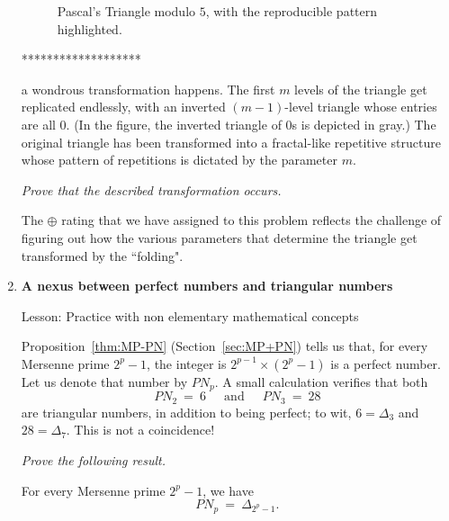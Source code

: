 \begin{enumerate}
{\begin{figure}[ht]
\begin{center}
        \caption{Pascal's Triangle modulo $5$, with the reproducible pattern highlighted.}
        \label{fig:TriangleModulo5shade}
\end{center}
\end{figure}
*******************}
a wondrous transformation happens.  The first $m$ levels of the triangle get replicated endlessly, with an inverted $(m-1)$-level triangle whose entries are all $0$.  (In the figure, the inverted triangle of $0$s is depicted in gray.)  The original triangle has been transformed into a fractal-like repetitive structure whose pattern of repetitions is dictated by the parameter $m$.

\medskip

{\em Prove that the described transformation occurs.}

\smallskip

The $\oplus$ rating that we have assigned to this problem reflects the challenge of figuring out how the various parameters that determine the triangle get transformed by the ``folding".

\medskip\item
{\bf A nexus between perfect numbers and triangular numbers}

{\sc Lesson:} Practice with non elementary mathematical concepts

\smallskip

Proposition~\ref{thm:MP-PN} (Section~\ref{sec:MP+PN}) tells us that, for every Mersenne prime $2^p-1$, the integer is $2^{p-1} \times (2^p-1)$ is a perfect number.  Let us denote that number by $PN_p$.  A small calculation verifies that both
\[ PN_2 \ = \ 6 \ \ \ \ \ \mbox{ and } \ \ \ \ \ PN_3 \ = \ 28 \]
are triangular numbers, in addition to being perfect; to wit, $6 =\Delta_3$ and $28=\Delta_7$.  This is not a coincidence!

\smallskip

{\em Prove the following result.}

\begin{prop}
For every Mersenne prime $2^p-1$, we have
\[ PN_p \ = \  \Delta_{2^p-1}. \]
\end{prop}


\end{enumerate}
